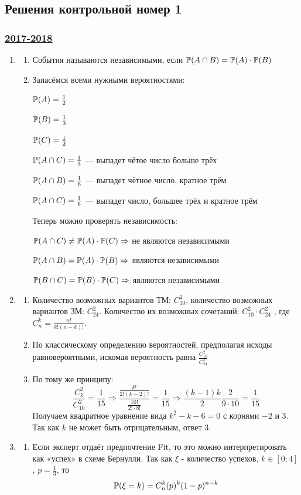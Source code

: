 \subsection*{Решения контрольной номер 1}

\subsubsection*{\hyperref[sec:kr_01_2017_2018]{2017-2018}}
\label{sec:sol_kr_01_2017_2018}

\begin{enumerate}
\item
\begin{enumerate}
\item События называются независимыми, если  $ \P(A \cap B) = \P(A) \cdot \P(B)$
\item Запасёмся всеми нужными вероятностями:

$\P(A) = \frac{1}{2}$

$\P(B) = \frac{1}{3}$

$\P(C) = \frac{1}{2}$

$\P(A \cap C) = \frac{1}{3} $ — выпадет чётое число больше трёх

$\P(A \cap B)  = \frac{1}{6}$ — выпадет чётное число, кратное трём

$\P(A \cap C) = \frac{1}{6}$ — выпадет число, большее трёх и кратное трём

Теперь можно проверять независимость:

$\P(A \cap C) \neq \P(A) \cdot \P(C) \Rightarrow$  не являются независимыми

$ \P(A \cap B) = \P(A) \cdot \P(B) \Rightarrow$ являются независимыми

$ \P(B \cap C) = \P(B) \cdot \P(C) \Rightarrow$ являются независимыми

\end{enumerate}
\item
\begin{enumerate}
\item Количество возможных вариантов ТМ: $ C_{10}^2 $,  количество возможных вариантов ЗМ: $ C_{24}^2 $. Количество их возможных сочетаний: $ C_{10}^2 \cdot C_{24}^2$ , где $ C_n^k = \frac{n!}{k!(n-k)!}$.
\item По классическому определению вероятностей, предполагая исходы равновероятными, искомая вероятность равна $ \frac{C_{16}^2}{C_{24}^2} $
\item По тому же принципу:
\[
\frac{C_k^2}{C_{10}^2} = \frac{1}{15} \Rightarrow \frac{\frac{k!}{2!(k-2)!}}{\frac{10!}{2! \cdot 8!}} = \frac{1}{15} \Rightarrow \frac{(k-1)k}{2}\frac{ 2}{9 \cdot 10} = \frac{1}{15}
\]
Получаем квадратное уравнение вида $ k^2 - k - 6 = 0 $ с корнями $-2$ и $3$. Так как $k$ не может быть отрицательным, ответ $3$.
\end{enumerate}
\item
\begin{enumerate}
\item Если эксперт отдаёт предпочтение Fit, то это можно интерпретировать как «успех» в схеме Бернулли. Так как $\xi$ - количество успехов, $ k \in [0;4]$, $p = \frac{1}{3} $, то
\[
\P(\xi = k) = C_n^k(p)^k(1-p)^{n-k}
\]


\end{enumerate}
\end{enumerate}
